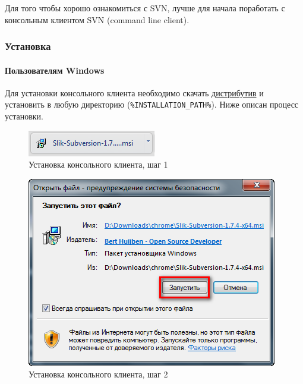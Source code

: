 \documentclass[a4paper,12pt]{article}
\begin{document}
Для того чтобы хорошо ознакомиться с SVN, лучше для начала поработать с
консольным клиентом SVN (command line client).

\subsubsection{Установка}

\paragraph{Пользователям Windows}

Для установки консольного клиента необходимо скачать
\href{http://www.sliksvn.com/en/download}{дистрибутив} и установить в
любую директорию (\texttt{\%INSTALLATION\_PATH\%}). Ниже описан процесс
установки.

\begin{figure}[!h]
	\centering
	\includegraphics[scale=0.90]{slik-svn-instalation-step-1.png}
	\vspace{-10pt}
	\caption{Установка консольного клиента, шаг 1}
\end{figure}

\begin{figure}[!h]
	\centering
	\includegraphics[scale=0.80]{slik-svn-instalation-step-2.png}
	\vspace{-10pt}
	\caption{Установка консольного клиента, шаг 2}
\end{figure}
\end{document}
